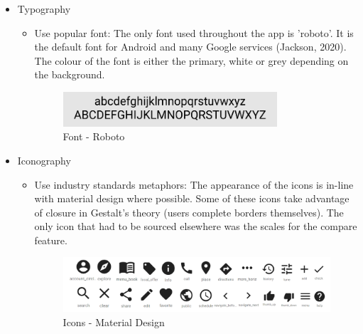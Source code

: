 \documentclass[a4 paper, 12pt]{article}
\begin{document}
\begin{itemize}
            \item Typography
                \begin{itemize}
                    \item Use popular font: The only font used throughout the app is 'roboto'. It is the default font for Android and many Google services (Jackson, 2020). The colour of the font is either the primary, white or grey depending on the background.
                    \begin{figure} [H]
                        \centering
                        \includegraphics[width=0.8\textwidth, frame]
                            {./Med_Fidelity/Med_Report/images/font.PNG}
                        \caption{Font - Roboto}
                    \end{figure}                    
                \end{itemize}

            \item Iconography
                \begin{itemize}
                    \item Use industry standards metaphors: The appearance of the icons is in-line with material design where possible. Some of these icons take advantage of closure in Gestalt's theory (users complete borders themselves). The only icon that had to be sourced elsewhere was the scales for the compare feature.  
                    \begin{figure} [H]
                        \centering
                        \includegraphics[width=\textwidth, frame]
                            {./Med_Fidelity/Med_Report/images/material_icons.PNG}    
                        \caption{Icons - Material Design}
                    \end{figure}   
                \end{itemize}  
                

\end{itemize}
\end{document}
